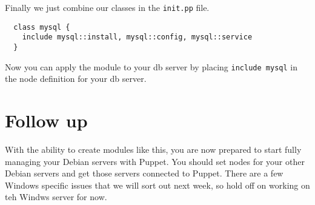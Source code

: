 \documentclass{article}   	%
\begin{document}
Finally we just combine our classes in the \texttt{init.pp} file.

\begin{verbatim}
  class mysql {
    include mysql::install, mysql::config, mysql::service
  }
\end{verbatim}

Now you can apply the module to your db server by placing \texttt{include mysql} in the node definition for your db server.

\section{Follow up}
With the ability to create modules like this, you are now prepared to start fully managing your Debian servers with Puppet.  You should set nodes for your other Debian servers and get those servers connected to Puppet. There are a few Windows specific issues that we will sort out next week, so hold off on working on teh Windws server for now.
\end{document}
